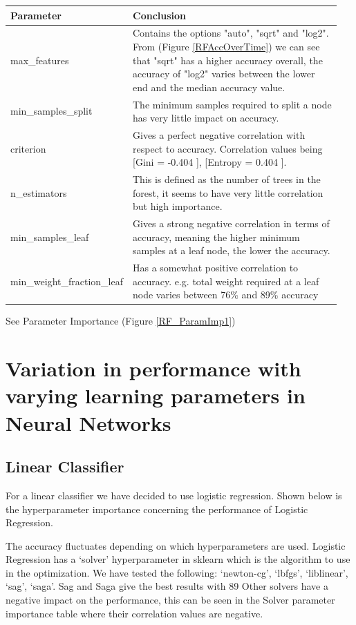\documentclass[11pt]{article}
\begin{document}
\begin{table}[ht]
  \centering
  \begin{tabular}{|p{0.25\linewidth} | p{0.7\linewidth}|} 
    \hline
    \textbf{Parameter}  & \textbf{Conclusion} \\ \hline
    max\_features & Contains the options "auto", "sqrt" and "log2". From (Figure \ref{RFAccOverTime}) we can see that "sqrt" has a higher accuracy overall, the accuracy of "log2" varies between the lower end and the median accuracy value.\\ \hline
    min\_samples\_split & The minimum samples required to split a node has very little impact on accuracy.  \\ \hline
    criterion & Gives a perfect negative correlation with respect to accuracy. Correlation values being [Gini = -0.404 ], [Entropy = 0.404 ]. \\ \hline
    n\_estimators & This is defined as the number of trees in the forest, it seems to have very little correlation but high importance. \\ \hline
    min\_samples\_leaf & Gives a strong negative correlation in terms of accuracy, meaning the higher minimum samples at a leaf node, the lower the accuracy. \\ \hline
    min\_weight\_fraction\_leaf & Has a somewhat positive correlation to accuracy. e.g. total weight required at a leaf node varies between 76\% and 89\% accuracy\\ \hline
  \end{tabular}
\end{table}\label{RF_Analysis_Table}
See Parameter Importance (Figure \ref{RF_ParamImp1})

\newpage
\section{Variation in performance with varying learning parameters in Neural Networks}
\subsection{Linear Classifier}

For a linear classifier we have decided to use logistic regression. 
Shown below is the hyperparameter importance concerning the performance of Logistic Regression.

The accuracy fluctuates depending on which hyperparameters are used. Logistic Regression has a ‘solver’ hyperparameter in sklearn which is the algorithm to use in the optimization. We have tested the following: ‘newton-cg’, ‘lbfgs’, ‘liblinear’, ‘sag’, ‘saga’. Sag and Saga give the best results with 89%
Other solvers have a negative impact on the performance, this can be seen in the Solver parameter importance table where their correlation values are negative.
\end{document}
